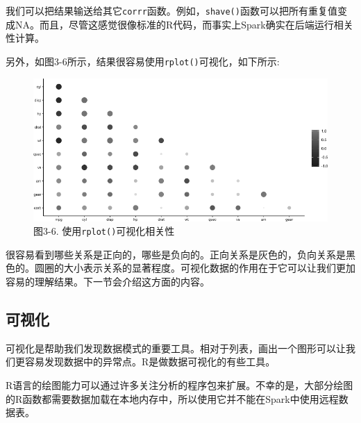\documentclass[
]{article}
\newenvironment{Shaded}{\begin{snugshade}}{\end{snugshade}}
\newcommand{\DataTypeTok}[1]{\textcolor[rgb]{0.13,0.29,0.53}{#1}}
\newcommand{\KeywordTok}[1]{\textcolor[rgb]{0.13,0.29,0.53}{\textbf{#1}}}
\newcommand{\NormalTok}[1]{#1}
\newcommand{\OperatorTok}[1]{\textcolor[rgb]{0.81,0.36,0.00}{\textbf{#1}}}
\newcommand{\StringTok}[1]{\textcolor[rgb]{0.31,0.60,0.02}{#1}}
\begin{document}
我们可以把结果输送给其它\texttt{corrr}函数。例如，\texttt{shave()}函数可以把所有重复值变成NA。而且，尽管这感觉很像标准的R代码，而事实上Spark确实在后端运行相关性计算。

另外，如图3-6所示，结果很容易使用\texttt{rplot()}可视化，如下所示:

\begin{Shaded}
\end{Shaded}

\begin{figure}
\centering
\includegraphics{figures/3_6.png}
\caption{图3-6. 使用\texttt{rplot()}可视化相关性}
\end{figure}

很容易看到哪些关系是正向的，哪些是负向的。正向关系是灰色的，负向关系是黑色的。圆圈的大小表示关系的显著程度。可视化数据的作用在于它可以让我们更加容易的理解结果。下一节会介绍这方面的内容。

\hypertarget{ux53efux89c6ux5316}{%
\subsection{可视化}\label{ux53efux89c6ux5316}}

可视化是帮助我们发现数据模式的重要工具。相对于列表，画出一个图形可以让我们更容易发现数据中的异常点。R是做数据可视化的有些工具。

R语言的绘图能力可以通过许多关注分析的程序包来扩展。不幸的是，大部分绘图的R函数都需要数据加载在本地内存中，所以使用它并不能在Spark中使用远程数据表。
\end{document}
